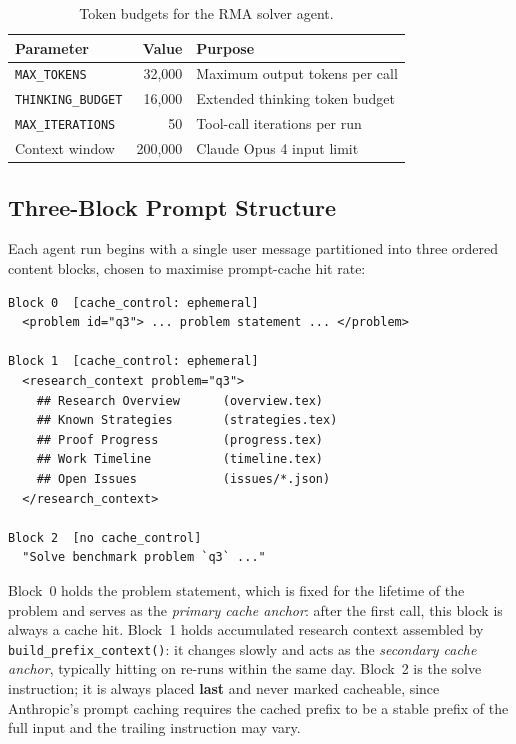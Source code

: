 \documentclass[11pt]{article}
\begin{document}
\begin{table}[h]
\centering
\small
\begin{tabularx}{\linewidth}{@{}lrX@{}}
\toprule
\textbf{Parameter} & \textbf{Value} & \textbf{Purpose} \\
\midrule
\texttt{MAX\_TOKENS}      & 32{,}000 & Maximum output tokens per call \\
\texttt{THINKING\_BUDGET} & 16{,}000 & Extended thinking token budget \\
\texttt{MAX\_ITERATIONS}  & 50       & Tool-call iterations per run \\
Context window            & 200{,}000 & Claude Opus 4 input limit \\
\bottomrule
\end{tabularx}
\caption{Token budgets for the RMA solver agent.}
\end{table}

\subsection{Three-Block Prompt Structure}

Each agent run begins with a single user message partitioned into three ordered
content blocks, chosen to maximise prompt-cache hit rate:

\begin{lstlisting}[caption={Three-block first user message (agent.py).}]
Block 0  [cache_control: ephemeral]
  <problem id="q3"> ... problem statement ... </problem>

Block 1  [cache_control: ephemeral]
  <research_context problem="q3">
    ## Research Overview      (overview.tex)
    ## Known Strategies       (strategies.tex)
    ## Proof Progress         (progress.tex)
    ## Work Timeline          (timeline.tex)
    ## Open Issues            (issues/*.json)
  </research_context>

Block 2  [no cache_control]
  "Solve benchmark problem `q3` ..."
\end{lstlisting}

\noindent
Block~0 holds the problem statement, which is fixed for the lifetime of the
problem and serves as the \emph{primary cache anchor}: after the first call,
this block is always a cache hit.
Block~1 holds accumulated research context assembled by
\texttt{build\_prefix\_context()}: it changes slowly and acts as the
\emph{secondary cache anchor}, typically hitting on re-runs within the same day.
Block~2 is the solve instruction; it is always placed \textbf{last} and never
marked cacheable, since Anthropic's prompt caching requires the cached prefix
to be a stable prefix of the full input and the trailing instruction may vary.
\end{document}
